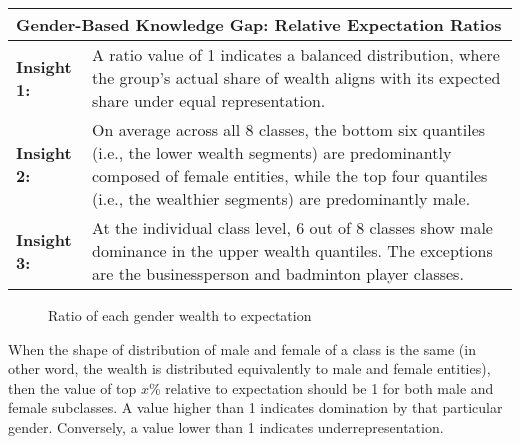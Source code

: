 \begin{table}[h]
    \centering
    \renewcommand{\arraystretch}{1.3}
    \begin{tabular}{|l p{12cm}|} 
        \hline
        \multicolumn{2}{|l|}{\textbf{Gender-Based Knowledge Gap: Relative Expectation Ratios}} \\
        \hline
        \textbf{Insight 1:} & A ratio value of 1 indicates a balanced distribution, where the group's actual share of wealth aligns with its expected share under equal representation. \\
        \textbf{Insight 2:} & On average across all 8 classes, the bottom six quantiles (i.e., the lower wealth segments) are predominantly composed of female entities, while the top four quantiles (i.e., the wealthier segments) are predominantly male. \\
        \textbf{Insight 3:} & At the individual class level, 6 out of 8 classes show male dominance in the upper wealth quantiles. The exceptions are the businessperson and badminton player classes. \\
        \hline
    \end{tabular}
\end{table}


\begin{figure}[!h]
    \centering 
    
    
    \caption{Ratio of each gender wealth to expectation} \label{fig:gender - ratio of gender wealth to expectation}
    
\end{figure}

When the shape of distribution of male and female of a class is the same (in other word, the wealth is distributed equivalently to male and female entities), then the value of top \(x\)\% relative to expectation should be 1 for both male and female subclasses. A value higher than 1 indicates domination by that particular gender. Conversely, a value lower than 1 indicates underrepresentation.

